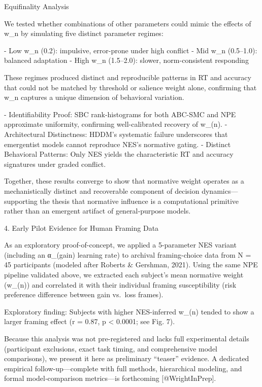 Equifinality Analysis

We tested whether combinations of other parameters could mimic the
effects of w_n by simulating five distinct parameter regimes:

- Low w_n (0.2): impulsive, error-prone under high conflict
- Mid w_n (0.5–1.0): balanced adaptation
- High w_n (1.5–2.0): slower, norm-consistent responding

These regimes produced distinct and reproducible patterns in RT and
accuracy that could not be matched by threshold or salience weight
alone, confirming that w_n captures a unique dimension of behavioral
variation.

- Identifiability Proof: SBC rank‐histograms for both ABC-SMC and NPE
  approximate uniformity, confirming well-calibrated recovery of w_(n).
- Architectural Distinctness: HDDM’s systematic failure underscores that
  emergentist models cannot reproduce NES’s normative gating.
- Distinct Behavioral Patterns: Only NES yields the characteristic RT
  and accuracy signatures under graded conflict.

Together, these results converge to show that normative weight operates
as a mechanistically distinct and recoverable component of decision
dynamics—supporting the thesis that normative influence is a
computational primitive rather than an emergent artifact of
general‐purpose models.

4. Early Pilot Evidence for Human Framing Data

As an exploratory proof-of-concept, we applied a 5-parameter NES variant
(including an α_(gain) learning rate) to archival framing-choice data
from N = 45 participants (modeled after Roberts & Gershman, 2021). Using
the same NPE pipeline validated above, we extracted each subject’s mean
normative weight (w_(n)) and correlated it with their individual framing
susceptibility (risk preference difference between gain vs. loss
frames).

  Exploratory finding: Subjects with higher NES-inferred w_(n) tended to
  show a larger framing effect (r = 0.87, p < 0.0001; see Fig. 7).

Because this analysis was not pre-registered and lacks full experimental
details (participant exclusions, exact task timing, and comprehensive
model comparisons), we present it here as preliminary “teaser” evidence.
A dedicated empirical follow-up—complete with full methods, hierarchical
modeling, and formal model‐comparison metrics—is forthcoming
[@WrightInPrep].

